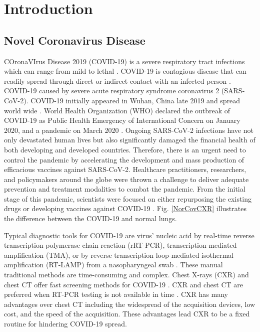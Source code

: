 
\chapter{Introduction} %




\label{chp:intro} %
\section{Novel Coronavirus Disease}

COronaVIrus Disease 2019 (COVID-19) is a severe respiratory tract infections which can range from mild to lethal \cite{acter2020evolution}. COVID-19 is contagious disease that can readily spread through direct or indirect contact with an infected person \cite{singhal2020review}. COVID-19 caused by severe acute respiratory syndrome coronavirus 2 (SARS-CoV-2). COVID-19 initially appeared in Wuhan, China late 2019 and spread world wide \cite{hui2020continuing}. World Health Organization (WHO) declared the outbreak of COVID-19 as Public Health Emergency of International Concern on  January 2020, and a pandemic on March 2020 \cite{platto2020covid19}.
Ongoing SARS-CoV-2 infections have not only devastated human lives but also significantly damaged the financial health of both developing and developed countries. Therefore, there is an urgent need to control the pandemic by accelerating the development and mass production of efficacious vaccines against SARS-CoV-2. Healthcare practitioners, researchers, and policymakers around the globe were thrown a challenge to deliver adequate prevention and treatment modalities to combat the pandemic. From the initial stage of this pandemic, scientists were focused on either repurposing the existing drugs or developing vaccines against COVID-19 \cite{le2020evolution}. Fig. \ref{NorCovCXR} illustrates the difference between the COVID-19 and normal lungs.

Typical diagnostic tools for COVID-19 are virus’ nucleic acid by real-time reverse transcription polymerase chain reaction (rRT-PCR), transcription-mediated amplification (TMA), or by reverse transcription loop-mediated isothermal amplification (RT-LAMP) from a nasopharyngeal swab \cite{tahamtan2020real}.  These manual traditional methods are time-consuming and complex. Chest X-rays (CXR) and chest CT offer fast screening methods for COVID-19 \cite{salehi2020coronavirus}\cite{wu2020new}\cite{zu2020coronavirus}. CXR and chest CT are preferred when RT-PCR testing is not available in time \cite{erickson1993advanced}. CXR has many advantages over chest CT including the widespread of the acquisition devices, low cost, and the speed of the acquisition\cite{narin2021automatic}\cite{brenner2007computed}\cite{rubin2020role}\cite{shi2020review}. These advantages lead CXR to be a fixed routine for hindering COVID-19 spread. 

